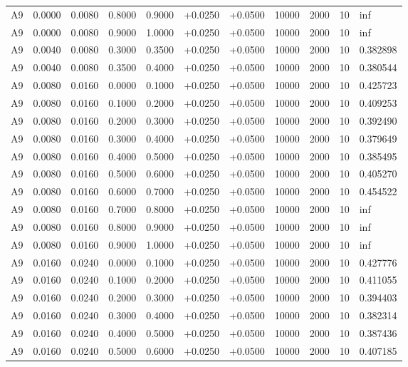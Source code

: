 \documentclass{article}
\begin{document}
\begin{longtable}{l r r r r r r r r r l}
A9 & 0.0000 & 0.0080 & 0.8000 & 0.9000 & +0.0250 & +0.0500 & 10000 & 2000 & 10 & inf \\
A9 & 0.0000 & 0.0080 & 0.9000 & 1.0000 & +0.0250 & +0.0500 & 10000 & 2000 & 10 & inf \\
A9 & 0.0040 & 0.0080 & 0.3000 & 0.3500 & +0.0250 & +0.0500 & 10000 & 2000 & 10 & 0.382898 \\
A9 & 0.0040 & 0.0080 & 0.3500 & 0.4000 & +0.0250 & +0.0500 & 10000 & 2000 & 10 & 0.380544 \\
A9 & 0.0080 & 0.0160 & 0.0000 & 0.1000 & +0.0250 & +0.0500 & 10000 & 2000 & 10 & 0.425723 \\
A9 & 0.0080 & 0.0160 & 0.1000 & 0.2000 & +0.0250 & +0.0500 & 10000 & 2000 & 10 & 0.409253 \\
A9 & 0.0080 & 0.0160 & 0.2000 & 0.3000 & +0.0250 & +0.0500 & 10000 & 2000 & 10 & 0.392490 \\
A9 & 0.0080 & 0.0160 & 0.3000 & 0.4000 & +0.0250 & +0.0500 & 10000 & 2000 & 10 & 0.379649 \\
A9 & 0.0080 & 0.0160 & 0.4000 & 0.5000 & +0.0250 & +0.0500 & 10000 & 2000 & 10 & 0.385495 \\
A9 & 0.0080 & 0.0160 & 0.5000 & 0.6000 & +0.0250 & +0.0500 & 10000 & 2000 & 10 & 0.405270 \\
A9 & 0.0080 & 0.0160 & 0.6000 & 0.7000 & +0.0250 & +0.0500 & 10000 & 2000 & 10 & 0.454522 \\
A9 & 0.0080 & 0.0160 & 0.7000 & 0.8000 & +0.0250 & +0.0500 & 10000 & 2000 & 10 & inf \\
A9 & 0.0080 & 0.0160 & 0.8000 & 0.9000 & +0.0250 & +0.0500 & 10000 & 2000 & 10 & inf \\
A9 & 0.0080 & 0.0160 & 0.9000 & 1.0000 & +0.0250 & +0.0500 & 10000 & 2000 & 10 & inf \\
A9 & 0.0160 & 0.0240 & 0.0000 & 0.1000 & +0.0250 & +0.0500 & 10000 & 2000 & 10 & 0.427776 \\
A9 & 0.0160 & 0.0240 & 0.1000 & 0.2000 & +0.0250 & +0.0500 & 10000 & 2000 & 10 & 0.411055 \\
A9 & 0.0160 & 0.0240 & 0.2000 & 0.3000 & +0.0250 & +0.0500 & 10000 & 2000 & 10 & 0.394403 \\
A9 & 0.0160 & 0.0240 & 0.3000 & 0.4000 & +0.0250 & +0.0500 & 10000 & 2000 & 10 & 0.382314 \\
A9 & 0.0160 & 0.0240 & 0.4000 & 0.5000 & +0.0250 & +0.0500 & 10000 & 2000 & 10 & 0.387436 \\
A9 & 0.0160 & 0.0240 & 0.5000 & 0.6000 & +0.0250 & +0.0500 & 10000 & 2000 & 10 & 0.407185 \\

\end{longtable}
\end{document}
